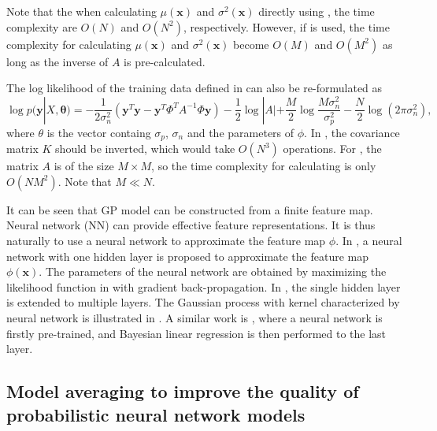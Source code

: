 Note that the when calculating $\mu(\bm{x})$ and $\sigma^2(\bm{x})$ directly using , the time complexity are $O(N)$ and $O(N^2)$, respectively. However, if  is used, the time complexity for calculating $\mu(\bm{x})$ and $\sigma^2(\bm{x})$ become $O(M)$ and $O(M^2)$ as long as the inverse of $A$ is pre-calculated.

The log likelihood of the training data defined in  can also be re-formulated as \cite{lazaro2010marginalized}
\begin{equation}
    \label{eq:DegenerateGPloglikelihood}
    \log p(\bm{y} | X, \bm{\theta}) = -\frac{1}{2\sigma_n^2}(\bm{y}^T\bm{y} - \bm{y}^T \Phi^T A^{-1} \Phi \bm{y}) - \frac{1}{2}\log |A| + \frac{M}{2} \log \frac{M \sigma_n^2}{\sigma_p^2} - \frac{N}{2} \log(2 \pi \sigma_n^2),
\end{equation}
where $\theta$ is the vector containg $\sigma_p$, $\sigma_n$ and the parameters of $\phi$. In , the covariance matrix $K$ should be inverted, which would take $O(N^3)$ operations. For , the matrix $A$ is of the size $M \times M$, so the time complexity for calculating  is only $O(NM^2)$. Note that $M \ll N$.

It can be seen that GP model can be constructed from a finite feature map. Neural network (NN) can provide effective feature representations. It is thus naturally to use a neural network to approximate the feature map $\phi$. In \cite{lazaro2010marginalized}, a neural network with one hidden layer is proposed to approximate the feature map $\phi(\bm{x})$. The parameters of the neural network are obtained by maximizing the likelihood function in  with gradient back-propagation. In \cite{huang2015scalable}, the single hidden layer is extended to multiple layers. The Gaussian process with kernel characterized by neural network is illustrated in . A similar work is \cite{snoek2015scalable}, where a neural network is firstly pre-trained, and Bayesian linear regression is then performed to the last layer.

\subsection{Model averaging to improve the quality of probabilistic neural network models}\label{sec:deepensemble}

